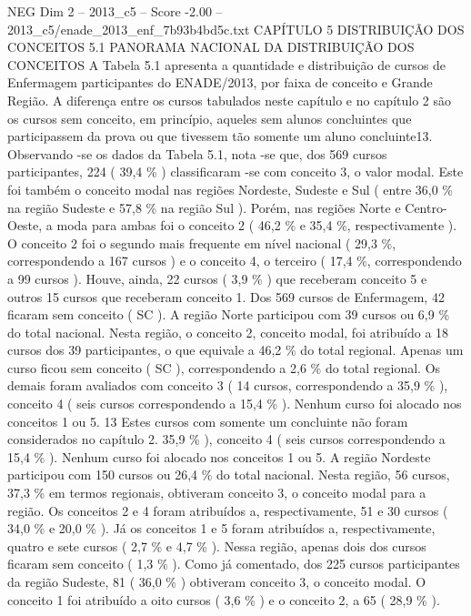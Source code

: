\begin{textsample}{NEG Dim 2 – 2013\_c5 – Score -2.00 – 2013\_c5/enade\_2013\_enf\_7b93b4bd5c.txt}  \label{ex:f2_neg_065}
CAPÍTULO 5 DISTRIBUIÇÃO DOS CONCEITOS 5.1 PANORAMA NACIONAL DA DISTRIBUIÇÃO DOS CONCEITOS A Tabela 5.1 apresenta a quantidade e distribuição de cursos de Enfermagem participantes do ENADE/2013, por faixa de conceito e Grande Região.
A diferença entre os cursos tabulados neste capítulo e no capítulo 2 são os cursos sem conceito, em princípio, aqueles sem alunos concluintes que participassem da prova ou que tivessem tão somente um aluno concluinte13.
Observando -se os dados da Tabela 5.1, nota -se que, dos 569 cursos participantes, 224 ( 39,4 \% ) classificaram -se com conceito 3, o valor modal.
Este foi também o conceito modal nas regiões Nordeste, Sudeste e Sul ( entre 36,0 \% na região Sudeste e 57,8 \% na região Sul ).
Porém, nas regiões Norte e Centro-Oeste, a moda para ambas foi o conceito 2 ( 46,2 \% e 35,4 \%, respectivamente ).
O conceito 2 foi o segundo mais frequente em nível nacional ( 29,3 \%, correspondendo a 167 cursos ) e o conceito 4, o terceiro ( 17,4 \%, correspondendo a 99 cursos ).
Houve, ainda, 22 cursos ( 3,9 \% ) que receberam conceito 5 e outros 15 cursos que receberam conceito 1.
Dos 569 cursos de Enfermagem, 42 ficaram sem conceito ( SC ).
A região Norte participou com 39 cursos ou 6,9 \% do total nacional.
Nesta região, o conceito 2, conceito modal, foi atribuído a 18 cursos dos 39 participantes, o que equivale a 46,2 \% do total regional.
Apenas um curso ficou sem conceito ( SC ), correspondendo a 2,6 \% do total regional.
Os demais foram avaliados com conceito 3 ( 14 cursos, correspondendo a 35,9 \% ), conceito 4 ( seis cursos correspondendo a 15,4 \% ).
Nenhum curso foi alocado nos conceitos 1 ou 5. 13 Estes cursos com somente um concluinte não foram considerados no capítulo 2. 35,9 \% ), conceito 4 ( seis cursos correspondendo a 15,4 \% ).
Nenhum curso foi alocado nos conceitos 1 ou 5.
A região Nordeste participou com 150 cursos ou 26,4 \% do total nacional.
Nesta região, 56 cursos, 37,3 \% em termos regionais, obtiveram conceito 3, o conceito modal para a região.
Os conceitos 2 e 4 foram atribuídos a, respectivamente, 51 e 30 cursos ( 34,0 \% e 20,0 \% ).
Já os conceitos 1 e 5 foram atribuídos a, respectivamente, quatro e sete cursos ( 2,7 \% e 4,7 \% ).
Nessa região, apenas dois dos cursos ficaram sem conceito ( 1,3 \% ).
Como já comentado, dos 225 cursos participantes da região Sudeste, 81 ( 36,0 \% ) obtiveram conceito 3, o conceito modal.
O conceito 1 foi atribuído a oito cursos ( 3,6 \% ) e o conceito 2, a 65 ( 28,9 \% ).

\end{textsample}
